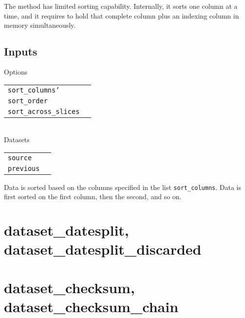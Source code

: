 The method has limited sorting capability.  Internally, it sorts one
column at a time, and it requires to hold that complete column plus an
indexing column in memory simultaneously.

\subsection{Inputs}

\noindent Options\\

\begin{tabular}{ll}
  \texttt{sort\_columns'} & \\    %
  \texttt{sort\_order} & \\        %
  \texttt{sort\_across\_slices} & \\%
\end{tabular}\\

\noindent Datasets\\

\begin{tabular}{ll}
  \texttt{source} & \\
  \texttt{previous} & \\
\end{tabular}

Data is sorted based on the columns specified in the list
\texttt{sort\_columns}.  Data is first sorted on the first column,
then the second, and so on.





\clearpage
\section{dataset\_datesplit, dataset\_datesplit\_discarded}

\clearpage
\section{dataset\_checksum, dataset\_checksum\_chain}


